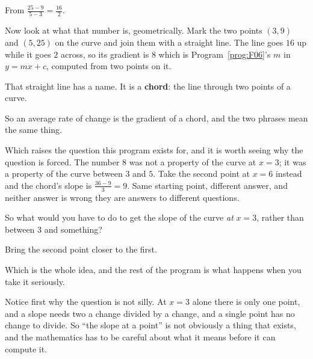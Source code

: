 \begin{fr}
From $\frac{25 - 9}{5 - 3} = \frac{16}{2}$.

Now look at what that number is, geometrically. Mark the two points $(3, 9)$
and $(5, 25)$ on the curve and join them with a straight line. The line goes
$16$ up while it goes $2$ across, so its gradient is $8$ \dash{} which is
Program~\ref{prog:F06}'s $m$ in $y = mx + c$, computed from two points on it.

That straight line has a name. It is a \textbf{chord}: the line through two
points of a curve.

So an average rate of change is the gradient of a chord, and the two phrases
mean the same thing.

Which raises the question this program exists for, and it is worth seeing why
the question is forced. The number $8$ was not a property of the curve at
$x = 3$; it was a property of the curve between $3$ and $5$. Take the second
point at $x = 6$ instead and the chord's slope is $\frac{36 - 9}{3} = 9$. Same
starting point, different answer, and neither answer is wrong \dash{} they are
answers to different questions.

So what would you have to do to get the slope of the curve \emph{at} $x = 3$,
rather than between $3$ and something?
\dotline
\nextframe
\end{fr}

\begin{fr}
\begin{ansblock}
Bring the second point closer to the first.
\end{ansblock}

Which is the whole idea, and the rest of the program is what happens when you
take it seriously.

Notice first why the question is not silly. At $x = 3$ alone there is only one
point, and a slope needs two \dash{} a change divided by a change, and a
single point has no change to divide. So \enquote{the slope at a point} is not
obviously a thing that exists, and the mathematics has to be careful about
what it means before it can compute it.

\end{fr}

